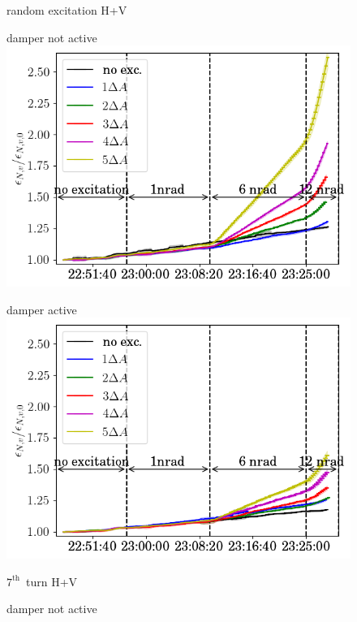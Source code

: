 \documentclass[%
 reprint,
 amsmath,amssymb,
 aps,
prstab,
]{revtex4-1}
\begin{document}
\begin{figure}[h]
	\centering
	random excitation H+V\\
	\begin{minipage}[t]{0.49\linewidth}
		\centering
		damper not active
		\includegraphics[width=1.0\linewidth]{2017_emitv_avg_rel_vran_no_damper.png}
	\end{minipage}	
	\begin{minipage}[t]{0.49\linewidth}
		\centering
		damper active
		\includegraphics[width=1.0\linewidth]{2017_emitv_avg_rel_vran_with_damper.png}
	\end{minipage}	
		\centering
		$7^{\mathrm{th}}$~turn H+V\\
	\begin{minipage}[t]{0.49\linewidth}
		\centering
		damper not active

\end{minipage}
\end{figure}
\end{document}
